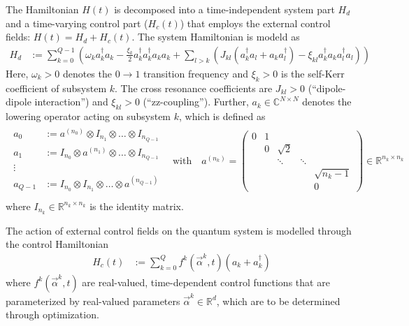 \documentclass[11pt]{article}
\newcommand{\R}{\mathds{R}}
\newcommand{\C}{\mathds{C}}
\begin{document}
The Hamiltonian $H(t)$ is decomposed into a time-independent system part $H_d$ and a time-varying control part ($H_c(t)$) that employs the external control fields: $H(t) = H_d + H_c(t)$. The system Hamiltonian is modeld as 
\begin{align}
  H_d &:= \sum_{k=0}^{Q-1} \left(\omega_k a_k^{\dagger}a_k- \frac{\xi_k}{2} a_k^{\dagger}a_k^{\dagger}a_k a_k  + \sum_{l> k} \left(  J_{kl} \left( a_k^\dagger a_l + a_k a_l^\dagger \right) -\xi_{kl} a_{k}^{\dagger}a_{k}   a_{l}^{\dagger} a_{l} \right)\right)
\end{align}
Here, $\omega_k>0$ denotes the $0 \rightarrow 1$ transition frequency and $\xi_k>0$ is the self-Kerr coefficient of subsystem $k$. The cross resonance coefficients are $J_{kl}>0$ (``dipole-dipole interaction'') and $\xi_{kl}>0$ (``zz-coupling''). Further,
$a_k\in \C^{N\times N}$ denotes the lowering operator acting on subsystem $k$, which is defined as
\begin{align}
  \begin{array}{rl}
  a_0 &:= a^{(n_0)} \otimes I_{n_1} \otimes \dots \otimes
  I_{n_{Q-1}}\\
  a_1 &:= I_{n_0} \otimes a^{(n_1)} \otimes \dots \otimes
  I_{n_{Q-1}}\\
  \vdots \, & \\
  a_{Q-1} &:= I_{n_0} \otimes I_{n_1} \otimes \dots \otimes
  a^{(n_{Q-1})}\\
  \end{array}
  \quad \text{with}\quad
 a^{(n_k)} = \begin{pmatrix}
   0 & 1 &          &         &    \\
     & 0 & \sqrt{2} &         &     \\
     &   & \ddots   & \ddots  &    \\
     &   &          &         & \sqrt{n_k-1}  \\
     &   &          &         & 0   
 \end{pmatrix} \in \R^{n_k \times n_k}
\end{align}
where $I_{n_k} \in \R^{n_k \times n_k}$ is the identity matrix.

The action of external control fields on the quantum system is modelled through the control Hamiltonian 
\begin{align}
  H_c(t) &:= \sum_{k=0}^Q f^k(\vec{\alpha}^k,t) \left(a_k + a_k^\dagger \right)
\end{align}
where $f^k(\vec{\alpha}^k,t)$ are real-valued, time-dependent control functions that are parameterized by real-valued parameters $\vec{\alpha}^k\in \R^d$, which are to be determined through optimization. 
\end{document}
